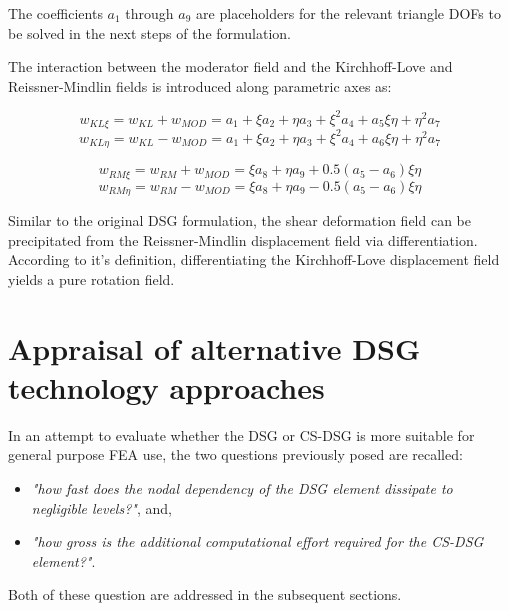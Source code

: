 The coefficients $a_1$ through $a_9$ are placeholders for the relevant triangle DOFs to be solved in the next steps of the formulation.

The interaction between the moderator field and the Kirchhoff-Love and Reissner-Mindlin fields is introduced along parametric axes as:

\begin{equation} 
w_{KL \xi} = w_{KL} + w_{MOD} = a_1 + \xi a_2 + \eta a_3 + \xi^2 a_4 +a_5 \xi \eta + \eta^2 a_7
\label{eqDSGc3_4}
\end{equation}
\begin{equation} 
w_{KL \eta} = w_{KL} - w_{MOD} = a_1 + \xi a_2 + \eta a_3 + \xi^2 a_4 +a_6 \xi \eta + \eta^2 a_7
\label{eqDSGc3_5}
\end{equation}

\begin{equation} 
w_{RM \xi} = w_{RM} + w_{MOD} = \xi a_8 + \eta a_9 + 0.5(a_5 - a_6)\xi \eta
\label{eqDSGc3_6}
\end{equation}
\begin{equation} 
w_{RM \eta} = w_{RM} - w_{MOD} = \xi a_8 + \eta a_9 - 0.5(a_5 - a_6)\xi \eta
\label{eqDSGc3_7}
\end{equation}

Similar to the original DSG formulation, the shear deformation field can be precipitated from the Reissner-Mindlin displacement field via differentiation. According to it's definition, differentiating the Kirchhoff-Love displacement field yields a pure rotation field.



\section{Appraisal of alternative DSG technology approaches}
\label{CSDSG appraisal}
In an attempt to evaluate whether the DSG or CS-DSG is more suitable for general purpose FEA use, the two questions previously posed are recalled:

\begin{itemize}
	\item \textit{"how fast does the nodal dependency of the DSG element dissipate to negligible levels?"}, and,
	\item \textit{"how gross is the additional computational effort required for the CS-DSG element?"}.
\end{itemize}

Both of these question are addressed in the subsequent sections.

